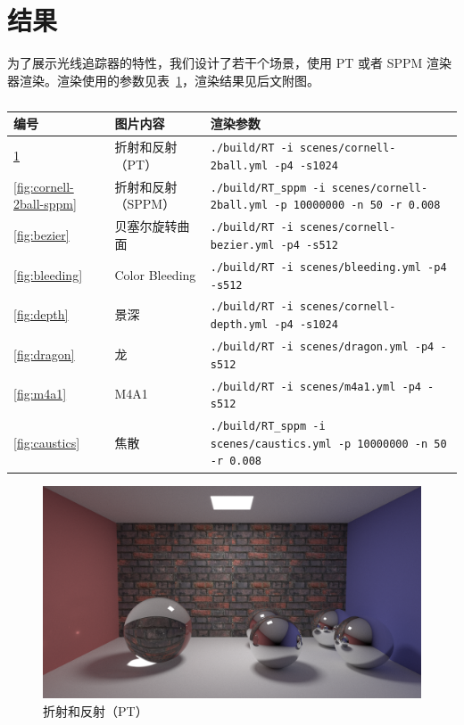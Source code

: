 \documentclass[cn]{report}
\let\t\texttt
\begin{document}
    \section{结果}
    为了展示光线追踪器的特性，我们设计了若干个场景，使用 PT 或者 SPPM 渲染器渲染。渲染使用的参数见表~\ref{tab:render-args}，渲染结果见后文附图。
    \begin{table}[htbp]
        \centering
        \small
        \begin{tabular}{lll}\toprule
            编号 & 图片内容 & 渲染参数 \\ \midrule
            \ref{fig:cornell-2ball} & 折射和反射（PT） & \t{./build/RT -i scenes/cornell-2ball.yml -p4 -s1024} \\
            \ref{fig:cornell-2ball-sppm} & 折射和反射（SPPM） & \t{./build/RT\_sppm -i scenes/cornell-2ball.yml -p 10000000 -n 50 -r 0.008} \\
            \ref{fig:bezier} & 贝塞尔旋转曲面 & \t{./build/RT -i scenes/cornell-bezier.yml -p4 -s512} \\
            \ref{fig:bleeding} & Color Bleeding & \t{./build/RT -i scenes/bleeding.yml -p4 -s512} \\
            \ref{fig:depth} & 景深 & \t{./build/RT -i scenes/cornell-depth.yml -p4 -s1024} \\
            \ref{fig:dragon} & 龙 & \t{./build/RT -i scenes/dragon.yml -p4 -s512} \\
            \ref{fig:m4a1} & M4A1 & \t{./build/RT -i scenes/m4a1.yml -p4 -s512} \\
            \ref{fig:caustics} & 焦散 & \t{./build/RT\_sppm -i scenes/caustics.yml -p 10000000 -n 50 -r 0.008} \\
            \bottomrule
        \end{tabular}
        \caption{}\label{tab:render-args}
    \end{table}

\ifdefined\nogallery\else
    \begin{figure}[htbp]
        \centering
        \includegraphics[width=\linewidth]{../results/cornell-2ball.png}
        \caption{折射和反射（PT）}
        \label{fig:cornell-2ball}
    \end{figure}
\end{document}
